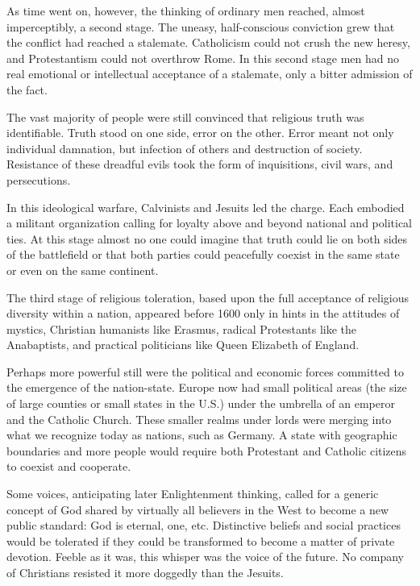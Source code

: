 As time went on, however, the thinking of ordinary men reached, almost imperceptibly, a second
stage. The uneasy, half-conscious conviction grew that the conflict had reached a stalemate.
Catholicism could not crush the new heresy, and Protestantism could not overthrow Rome. In this
second stage men had no real emotional or intellectual acceptance of a stalemate, only a bitter
admission of the fact.

The vast majority of people were still convinced that religious truth was identifiable. Truth stood
on one side, error on the other. Error meant not only individual damnation, but infection of others
and destruction of society. Resistance of these dreadful evils took the form of inquisitions, civil
wars, and persecutions.

In this ideological warfare, Calvinists and Jesuits led the charge. Each embodied a militant
organization calling for loyalty above and beyond national and political ties. At this stage almost
no one could imagine that truth could lie on both sides of the battlefield or that both parties
could peacefully coexist in the same state or even on the same continent.

The third stage of religious toleration, based upon the full acceptance of religious diversity
within a nation, appeared before 1600 only in hints in the attitudes of mystics, Christian humanists
like Erasmus, radical Protestants like the Anabaptists, and practical politicians like Queen
Elizabeth of England.

Perhaps more powerful still were the political and economic forces committed to the emergence of the
nation-state. Europe now had small political areas (the size of large counties or small states in
the U.S.) under the umbrella of an emperor and the Catholic Church. These smaller realms under lords
were merging into what we recognize today as nations, such as Germany. A state with geographic
boundaries and more people would require both Protestant and Catholic citizens to coexist and
cooperate.

Some voices, anticipating later Enlightenment thinking, called for a generic concept of God shared
by virtually all believers in the West to become a new public standard: God is eternal, one, etc.
Distinctive beliefs and social practices would be tolerated if they could be transformed to become a
matter of private devotion. Feeble as it was, this whisper was the voice of the future. No company
of Christians resisted it more doggedly than the Jesuits.

